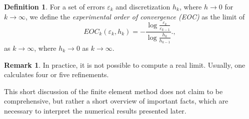 \documentclass[12pt,a4paper,twoside, open=right]{scrreprt}
\theoremstyle{definition}
\newtheorem{rem}[auf]{Remark}
\newtheorem{defn}[auf]{Definition}
\theoremstyle{plain}
\begin{document}
\begin{defn}
    For a set of errors $\varepsilon_k$ and discretization $h_k$, where $h\to 0$ for $k\to\infty$, we define the \emph{experimental order of convergence (EOC)} as the limit of 
    \begin{equation}
        EOC_k(\varepsilon_k,h_k)=-\frac{\log\frac{\varepsilon_k}{\varepsilon_{k-1}}}{\log{\frac{h_k}{h_{k-1}}}}.\label{eq:EOC},
    \end{equation} 
    as $k\to\infty$, where $h_k\to 0$ as $k\to\infty$.
\end{defn}
\begin{rem}
    In practice, it is not possible to compute a real limit. Usually, one calculates four or five refinements.
\end{rem}
This short discussion of the finite element method does not claim to be comprehensive, but rather a short overview of important facts, which are necessary to interpret the numerical results presented later.  
\end{document}
